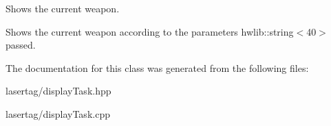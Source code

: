 Shows the current weapon. 

Shows the current weapon according to the parameters hwlib\+::string$<$40$>$ passed. 

The documentation for this class was generated from the following files\+:\begin{DoxyCompactItemize}
\item 
lasertag/display\+Task.\+hpp\item 
lasertag/display\+Task.\+cpp\end{DoxyCompactItemize}
